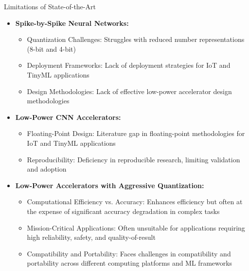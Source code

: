	
	
\begin{frame}{Limitations of State-of-the-Art}
	\begin{itemize}
		\item<1-> \textbf{Spike-by-Spike Neural Networks:}
		\begin{itemize}
			\item<2-> \alert{Quantization Challenges:} Struggles with reduced number representations (8-bit and 4-bit)
			\item<3-> \alert{Deployment Frameworks:} Lack of deployment strategies for IoT and TinyML applications
			\item<4-> \alert{Design Methodologies:} Lack of effective low-power accelerator design methodologies
		\end{itemize}
		\item<5-> \textbf{Low-Power CNN Accelerators:}
		\begin{itemize}
			\item<6-> \alert{Floating-Point Design:} Literature gap in floating-point methodologies for IoT and TinyML applications
			\item<7-> \alert{Reproducibility:} Deficiency in reproducible research, limiting validation and adoption
		\end{itemize}
		\item<8-> \textbf{Low-Power Accelerators with Aggressive Quantization:}
		\begin{itemize}
			\item<9-> \alert{Computational Efficiency vs. Accuracy:} Enhances efficiency but often at the expense of significant accuracy degradation in complex tasks
			\item<10-> \alert{Mission-Critical Applications:} Often unsuitable for applications requiring high reliability, safety, and quality-of-result
			\item<11-> \alert{Compatibility and Portability:} Faces challenges in compatibility and portability across different computing platforms and ML frameworks
		\end{itemize}
	\end{itemize}
\end{frame}
